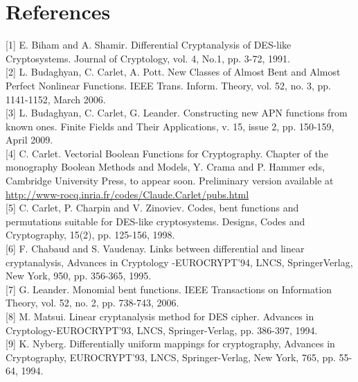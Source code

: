 \documentclass[10pt]{article}
\begin{document}
\section*{References}
[1] E. Biham and A. Shamir. Differential Cryptanalysis of DES-like Cryptosystems. Journal of Cryptology, vol. 4, No.1, pp. 3-72, 1991.\\[0pt]
[2] L. Budaghyan, C. Carlet, A. Pott. New Classes of Almost Bent and Almost Perfect Nonlinear Functions. IEEE Trans. Inform. Theory, vol. 52, no. 3, pp. 1141-1152, March 2006.\\[0pt]
[3] L. Budaghyan, C. Carlet, G. Leander. Constructing new APN functions from known ones. Finite Fields and Their Applications, v. 15, issue 2, pp. 150-159, April 2009.\\[0pt]
[4] C. Carlet. Vectorial Boolean Functions for Cryptography. Chapter of the monography Boolean Methods and Models, Y. Crama and P. Hammer eds, Cambridge University Press, to appear soon. Preliminary version available at \href{http://www-rocq.inria.fr/codes/Claude.Carlet/pubs.html}{http://www-rocq.inria.fr/codes/Claude.Carlet/pubs.html}\\[0pt]
[5] C. Carlet, P. Charpin and V. Zinoviev. Codes, bent functions and permutations suitable for DES-like cryptosystems. Designs, Codes and Cryptography, 15(2), pp. 125-156, 1998.\\[0pt]
[6] F. Chabaud and S. Vaudenay. Links between differential and linear cryptanalysis, Advances in Cryptology -EUROCRYPT'94, LNCS, SpringerVerlag, New York, 950, pp. 356-365, 1995.\\[0pt]
[7] G. Leander. Monomial bent functions. IEEE Transactions on Information Theory, vol. 52, no. 2, pp. 738-743, 2006.\\[0pt]
[8] M. Matsui. Linear cryptanalysis method for DES cipher. Advances in Cryptology-EUROCRYPT'93, LNCS, Springer-Verlag, pp. 386-397, 1994.\\[0pt]
[9] K. Nyberg. Differentially uniform mappings for cryptography, Advances in Cryptography, EUROCRYPT'93, LNCS, Springer-Verlag, New York, 765, pp. 55-64, 1994.
\end{document}
